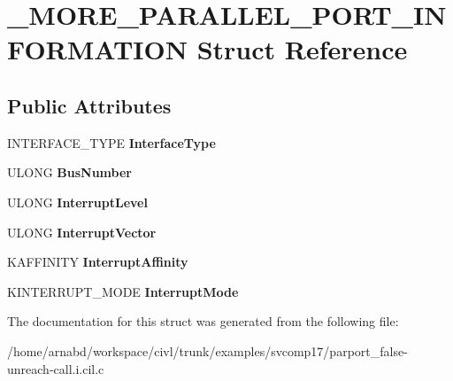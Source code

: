\hypertarget{struct__MORE__PARALLEL__PORT__INFORMATION}{}\section{\+\_\+\+M\+O\+R\+E\+\_\+\+P\+A\+R\+A\+L\+L\+E\+L\+\_\+\+P\+O\+R\+T\+\_\+\+I\+N\+F\+O\+R\+M\+A\+T\+I\+O\+N Struct Reference}
\label{struct__MORE__PARALLEL__PORT__INFORMATION}
\subsection*{Public Attributes}
\begin{DoxyCompactItemize}
\item 
\hypertarget{struct__MORE__PARALLEL__PORT__INFORMATION_a0186453579f76d86f373961adab5c7bc}{}I\+N\+T\+E\+R\+F\+A\+C\+E\+\_\+\+T\+Y\+P\+E {\bfseries Interface\+Type}\label{struct__MORE__PARALLEL__PORT__INFORMATION_a0186453579f76d86f373961adab5c7bc}

\item 
\hypertarget{struct__MORE__PARALLEL__PORT__INFORMATION_aad241969ce2e7bb0430e95bbc3aff582}{}U\+L\+O\+N\+G {\bfseries Bus\+Number}\label{struct__MORE__PARALLEL__PORT__INFORMATION_aad241969ce2e7bb0430e95bbc3aff582}

\item 
\hypertarget{struct__MORE__PARALLEL__PORT__INFORMATION_a7ae5bc2125951ab815924af3dba0f6bd}{}U\+L\+O\+N\+G {\bfseries Interrupt\+Level}\label{struct__MORE__PARALLEL__PORT__INFORMATION_a7ae5bc2125951ab815924af3dba0f6bd}

\item 
\hypertarget{struct__MORE__PARALLEL__PORT__INFORMATION_ab87b191542c4434298dfbae544b1a1d6}{}U\+L\+O\+N\+G {\bfseries Interrupt\+Vector}\label{struct__MORE__PARALLEL__PORT__INFORMATION_ab87b191542c4434298dfbae544b1a1d6}

\item 
\hypertarget{struct__MORE__PARALLEL__PORT__INFORMATION_a3d2ce2939fa736aac4248c06d688ff4b}{}K\+A\+F\+F\+I\+N\+I\+T\+Y {\bfseries Interrupt\+Affinity}\label{struct__MORE__PARALLEL__PORT__INFORMATION_a3d2ce2939fa736aac4248c06d688ff4b}

\item 
\hypertarget{struct__MORE__PARALLEL__PORT__INFORMATION_af1984c66530facb7ac009a61143c3d30}{}K\+I\+N\+T\+E\+R\+R\+U\+P\+T\+\_\+\+M\+O\+D\+E {\bfseries Interrupt\+Mode}\label{struct__MORE__PARALLEL__PORT__INFORMATION_af1984c66530facb7ac009a61143c3d30}

\end{DoxyCompactItemize}


The documentation for this struct was generated from the following file\+:\begin{DoxyCompactItemize}
\item 
/home/arnabd/workspace/civl/trunk/examples/svcomp17/parport\+\_\+false-\/unreach-\/call.\+i.\+cil.\+c\end{DoxyCompactItemize}

